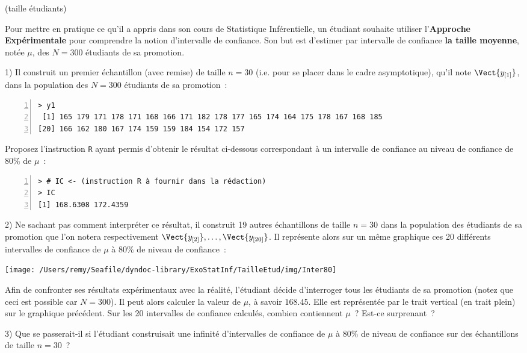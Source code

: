 \documentclass[10pt]{report}
\begin{document}
\begin{exercice} (taille étudiants)

Pour mettre en pratique ce qu'il a appris dans son cours de Statistique Inf{\'e}rentielle, un {\'e}tudiant souhaite utiliser l'\textbf{Approche Exp{\'e}rimentale} pour comprendre la notion d'intervalle de confiance. Son but est d'estimer par intervalle de confiance  \textbf{la taille moyenne}, not{\'e}e $\mu$, des $N=300$ {\'e}tudiants de sa promotion. 

1) Il construit un premier {\'e}chantillon (avec remise) de taille $n=30$ (i.e. pour se placer dans le cadre asymptotique), qu'il note $\Vect{y_{[1]}}$, dans la population des $N=300$ {\'e}tudiants de sa promotion~:

\begin{Verbatim}[frame=leftline,fontfamily=tt,fontshape=n,numbers=left]
> y1
 [1] 165 179 171 178 171 168 166 171 182 178 177 165 174 164 175 178 167 168 185
[20] 166 162 180 167 174 159 159 184 154 172 157
\end{Verbatim}


Proposez l'instruction \texttt{R} ayant permis d'obtenir le résultat ci-dessous correspondant à un intervalle de confiance au niveau de confiance de 80\% de $\mu$~:

\IndicR
\begin{Verbatim}[frame=leftline,fontfamily=tt,fontshape=n,numbers=left]
> # IC <- (instruction R à fournir dans la rédaction)
> IC
[1] 168.6308 172.4359
\end{Verbatim}





2) Ne sachant pas comment interpr{\'e}ter ce r{\'e}sultat, il construit 19 autres {\'e}chantillons de taille $n=30$ dans la population des {\'e}tudiants de sa promotion que l'on notera respectivement $\Vect{y_{[2]}},\ldots,\Vect{y_{[20]}}$. Il repr{\'e}sente alors sur un m{\^e}me graphique ces 20 diff{\'e}rents intervalles de confiance de $\mu$ {\`a} $80\%$ de niveau de confiance~:
\begin{center}
\texttt{[image: /Users/remy/Seafile/dyndoc-library/ExoStatInf/TailleEtud/img/Inter80]} 
\end{center}

Afin de confronter ses r{\'e}sultats exp{\'e}rimentaux avec la r{\'e}alit{\'e}, l'{\'e}tudiant d{\'e}cide d'interroger tous les {\'e}tudiants de sa promotion (notez que ceci est possible car $N=300$). Il peut alors calculer la valeur de $\mu$, {\`a} savoir $168.45$. Elle est repr{\'e}sent{\'e}e par le trait vertical (en trait plein) sur le graphique pr{\'e}c{\'e}dent. Sur les 20 intervalles de confiance calcul{\'e}s, combien contiennent $\mu$~? Est-ce surprenant~? 




3) Que se passerait-il si l'{\'e}tudiant construisait une infinit{\'e} d'intervalles de confiance de $\mu$ {\`a} $80\%$ de niveau de confiance sur des {\'e}chantillons de taille $n=30$~? \\



\end{exercice}
\end{document}
